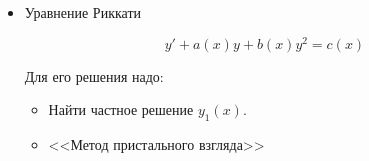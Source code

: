 \documentclass[a4paper, 14pt]{article}
\newcommand{\dx}{\mathrm{d}x}
\newcommand{\dv}[2]{%
  \ifstrempty{#2}%
    {\mathrm{d}#1}%
    {\frac{\mathrm{d}#1}{\mathrm{d}#2}}%
}
\theoremstyle{definition}
\newtheorem*{example}{Пример}
\newenvironment{answer}
  {\par\noindent\textbf{Ответ:}}
  {\par}
\begin{document}
\begin{itemize}
\begin{example}
    Решить пример $xy'-2x^2\sqrt{y} = 4y$.

    Разделим на $\sqrt{y}$, причём $y=0$ - решение.

    \[\frac{xy'}{\sqrt{y}}- 2x^2 = 4\sqrt{y}\]

    Замена $z = \sqrt{y}, \quad z' = \frac{y'}{x\sqrt{y}}$
    
    \[2xz' - 2x^2 = 4z \quad |\cdot\frac{1}{2}\]

    \[xz' - x^2 = z\]
    \[xz' -2z = x^2\]

    Решаем однородное $xz' -2z = 0$

    \[xz' -2z = 0\]
    
    \[xz' = 2z\]
    
    \[x\frac{\dv{z}{}}{\dx} = 2z\]
    
    \[\int{\frac{\dv{z}{}}{z}}=2\int{\frac{\dx}{x}}\]
    
    \[\ln|z| = 2\ln|x|+\ln{C}\]
    
    \[z=Cx^2\]
    
    \[z'=C'x^2+2Cx\]
    
     Подставляем получившиеся $z$ и $z'$ в исходное уравнение $xz' -2z = x^2$.

     \[C'x^3+2Cx^2-x^2=2Cx^2\]

     \[C'x^3=x^2\]

     \[C'=\frac{1}{x}\]

     \[C=\ln{\tilde{C}x}\]
     
     Подставляем $C$ в решение однородного уравнения.

     \[z = x^2\ln(Cx)\]

     Обратная замена: $y = z^2$

     \[y = x^4\ln^2(Cx)\]
    
\end{example}
\begin{answer}
    $y = x^4\ln^2(Cx); \quad y=0$
\end{answer}


\item \textbf{}Уравнение Риккати

\[y' + a(x)y + b(x)y^2 = c(x)\]

Для его решения надо:

\begin{itemize}
        \item[\scriptsize\textbullet] Найти частное решение $y_1(x)$.
        \item[\scriptsize\textbullet]<<Метод пристального взгляда>>


\end{itemize}
\end{itemize}
\end{document}
